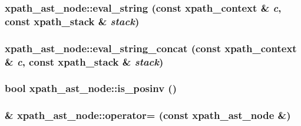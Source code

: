 \label{classxpath__ast__node_a92dd7048e28d486bc7f382d1fc6f1de6}
\hypertarget{classxpath__ast__node_a6b675237a590548b68d0e0b97518b6df}{
\subsubsection[{eval\_\-string}]{ xpath\_\-ast\_\-node::eval\_\-string (const {\bf xpath\_\-context} \& {\em c}, \/  const {\bf xpath\_\-stack} \& {\em stack})}}
\label{classxpath__ast__node_a6b675237a590548b68d0e0b97518b6df}
\hypertarget{classxpath__ast__node_aaf931a091af0fb91c25e90b205363b4e}{
\subsubsection[{eval\_\-string\_\-concat}]{ xpath\_\-ast\_\-node::eval\_\-string\_\-concat (const {\bf xpath\_\-context} \& {\em c}, \/  const {\bf xpath\_\-stack} \& {\em stack})}}
\label{classxpath__ast__node_aaf931a091af0fb91c25e90b205363b4e}
\hypertarget{classxpath__ast__node_a9253f88832441a357ea65639c73a34be}{
\subsubsection[{is\_\-posinv}]{\setlength{\rightskip}{0pt plus 5cm}bool xpath\_\-ast\_\-node::is\_\-posinv ()}}
\label{classxpath__ast__node_a9253f88832441a357ea65639c73a34be}
\hypertarget{classxpath__ast__node_a60fddea92b095c2b8705f12f7309e6aa}{
\subsubsection[{operator=}]{\& xpath\_\-ast\_\-node::operator= (const {\bf xpath\_\-ast\_\-node} \&)}}
